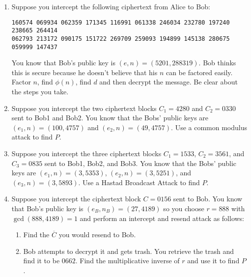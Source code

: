 \documentclass[class=article, crop=false]{standalone}
\begin{document}
\begin{enumerate}
\begin{enumerate}
		\end{enumerate}
	
	\item
		Suppose you intercept the following ciphertext from Alice to Bob:
	
		\begin{center}
			\texttt{160574 069934 062359 171345 116991 061338 246034 232780 197240 238665 264414}
			\\\texttt{062793 213172 090175 151722 269709 259093 194899 145138 280675 059999 147437}
		\end{center}
	
		You know that Bob's public key is $(e,n)=(5201,288319)$.
		Bob thinks this is secure
		because he doesn't believe that his $n$ can be factored easily.
		Factor $n$, find $\phi(n)$, find $d$ and then decrypt the message.
		Be clear about the steps you take.
	
	\item
		Suppose you intercept the two ciphertext blocks
		$C_1=4280$ and $C_2=0330$
		sent to Bob1 and Bob2.
		You know that the Bobs' public keys are
		$(e_1,n)=(100,4757)$
		and
		$(e_2,n)=(49,4757)$.
		Use a common modulus attack to find $P$.
	
	
	\item
		Suppose you intercept the three ciphertext blocks
		$C_1=1533$, $C_2=3561$, and $C_3=0835$
		sent to Bob1, Bob2, and Bob3.
		You know that the Bobs' public keys are
		$(e_1,n)=(3,5353)$,
		$(e_2,n)=(3,5251)$,
		and
		$(e_3,n)=(3,5893)$.
		Use a Hastad Broadcast Attack to find $P$.
	
	\item
		Suppose you intercept the ciphertext block
		$C=0156$ sent to Bob.
		You know that Bob's public key is $(e_B,n_B)=(27,4189)$
		so you choose $r=888$ with $\gcd(888,4189)=1$
		and perform an intercept and resend attack as follows:
		\begin{enumerate}
		\item
			Find the $\overline C$ you would resend to Bob.
	
		\item
			Bob attempts to decrypt it and gets trash.
			You retrieve the trash and find it to be $0662$.
			Find the multiplicative inverse of $r$
			and use it to find $P$.
	
		\end{enumerate}
	
	
	
		\end{enumerate}
\end{document}
